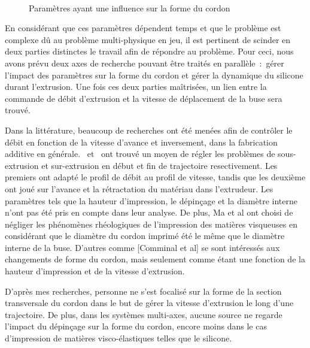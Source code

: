 \documentclass[11pt,a4paper]{article}
\begin{document}
        
        \begin{figure}[H]
            \centering
            \def\svgwidth{0.7\columnwidth}
            \caption{Paramètres ayant une influence sur la forme du cordon}~\label{fig:figure_variables}
        \end{figure}

            
        En considérant que ces paramètres dépendent temps et que le problème est complexe dû au problème multi-physique en jeu, il est pertinent de scinder en deux parties distinctes le travail afin de répondre au problème. Pour ceci, nous avons prévu deux axes de recherche pouvant être traités en parallèle~:~gérer l'impact des paramètres sur la forme du cordon et gérer la dynamique du silicone durant l'extrusion. Une fois ces deux parties maîtrisées, un lien entre la commande de débit d'extrusion et la vitesse de déplacement de la buse sera trouvé. 

        Dans la littérature, beaucoup de recherches ont été menées afin de contrôler le débit en fonction de la vitesse d'avance et inversement, dans la fabrication additive en générale.~\cite{ma2023improving} et~\cite{wu2023modeling} ont trouvé un moyen de régler les problèmes de sous-extrusion et sur-extrusion en début et fin de trajectoire resectivement. Les premiers ont adapté le profil de débit au profil de vitesse, tandis que les deuxième ont joué sur l'avance et la rétractation du matériau dans l'extrudeur. Les paramètres tels que la hauteur d'impression, le dépinçage et la diamètre interne n'ont pas été pris en compte dans leur analyse. De plus, Ma et al ont choisi de négliger les phénomènes rhéologiques de l'impression des matières visqueuses en considérant que le diamètre du cordon imprimé été le même que le diamètre interne de la buse. 
        D'autres comme [Comminal et al] se sont intéressés aux changements de forme du cordon, mais seulement comme étant une fonction de la hauteur d'impression et de la vitesse d'extrusion. 

        D'après mes recherches, personne ne s'est focalisé sur la forme de la section transversale du cordon dans le but de gérer la vitesse d'extrusion le long d'une trajectoire. De plus, dans les systèmes multi-axes, aucune source ne regarde l'impact du dépinçage sur la forme du cordon, encore moins dans le cas d'impression de matières visco-élastiques telles que le silicone.
\end{document}
